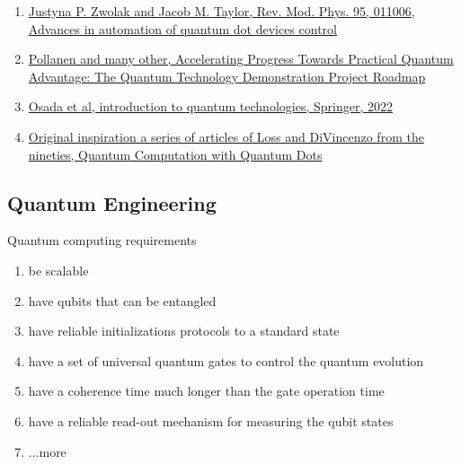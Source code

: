 \documentclass[%
oneside,                 %
final,                   %
10pt]{article}
\begin{document}
\begin{enumerate}
\item \href{{https://journals.aps.org/rmp/abstract/10.1103/RevModPhys.95.011006}}{Justyna P. Zwolak and Jacob M. Taylor, Rev. Mod. Phys. 95, 011006, Advances in automation of quantum dot devices control}

\item \href{{https://arxiv.org/pdf/2210.14757.pdf}}{Pollanen and many other, Accelerating Progress Towards Practical Quantum Advantage: The Quantum Technology Demonstration Project Roadmap}

\item \href{{https://link.springer.com/book/10.1007/978-981-19-4641-7}}{Osada et al, introduction to quantum technologies, Springer, 2022}

\item \href{{https://journals.aps.org/pra/pdf/10.1103/PhysRevA.57.120}}{Original inspiration a series of articles of Loss and DiVincenzo from the nineties, Quantum Computation with Quantum Dots}
\end{enumerate}

\noindent
\subsection{Quantum Engineering}

\begin{block}{Quantum computing requirements }
\begin{enumerate}
\item be scalable

\item have qubits that can be entangled

\item have reliable initializations protocols to a standard state

\item have a set of universal quantum gates to control the quantum evolution

\item have a coherence time much longer than the gate operation time

\item have a reliable read-out mechanism for measuring the qubit states

\item ...more
\end{enumerate}

\noindent
\end{block}
\end{document}
